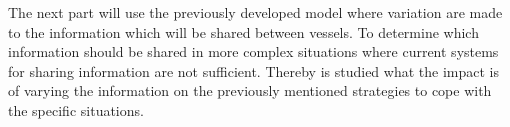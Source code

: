 The next part will use the previously developed model where variation are made to the information which will be shared between vessels. To determine which information should be shared in more complex situations where current systems for sharing information are not sufficient. Thereby is studied what the impact is of varying the information on the previously mentioned strategies to cope with the specific situations.
